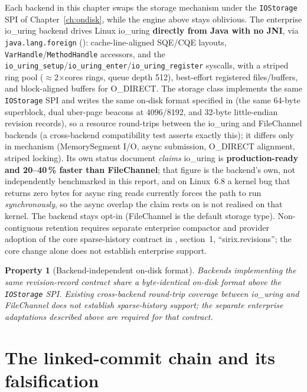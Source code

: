 \documentclass[11pt,a4paper,oneside]{report}
\theoremstyle{sirixthm}
\newtheorem{property}{Property}[chapter]
\newcommand{\code}[1]{\texttt{#1}}
\begin{document}
Each backend in this chapter swaps the storage mechanism under the \code{IOStorage} SPI of
Chapter~\ref{ch:ondisk}, while the engine above stays oblivious. The enterprise io\_uring
backend drives Linux io\_uring \textbf{directly from Java with no
JNI}, via \code{java.lang.foreign} (): cache-line-aligned SQE/CQE layouts,
\code{VarHandle}/\allowbreak\code{MethodHandle} accessors, and the
\code{io\_uring\_setup}/\allowbreak\code{io\_uring\_enter}/\allowbreak\code{io\_uring\_register} syscalls, with a
striped ring pool ($\approx$2$\times$cores rings, queue depth 512), best-effort registered
files/buffers, and block-aligned buffers for O\_DIRECT. The storage class implements the same
\code{IOStorage} SPI and writes the same on-disk format specified in 
(the same 64-byte superblock, dual uber-page beacons at 4096/8192, and 32-byte little-endian revision
records), so a resource round-trips between the io\_uring and FileChannel backends (a cross-backend
compatibility test asserts exactly this); it differs only in mechanism (MemorySegment I/O, async
submission, O\_DIRECT alignment, striped locking). Its own status document \emph{claims} io\_uring is
\textbf{production-ready and 20--40\,\% faster than FileChannel}; that figure is the backend's own, not
independently benchmarked in this report, and on Linux~6.8 a kernel bug that returns zero bytes for async
ring reads currently forces the path to run \emph{synchronously}, so the async overlap the claim rests on
is not realised on that kernel. The backend stays opt-in (FileChannel is the default storage type).
Non-contiguous retention requires separate enterprise compactor and provider adoption of the core
sparse-history contract in , section~1, ``sirix.revisions''; the core
change alone does not establish enterprise support.

\begin{property}[Backend-independent on-disk format]\label{prop:backendid}
Backends implementing the same revision-record contract share a byte-identical on-disk format
above the \code{IOStorage} SPI. Existing cross-backend
round-trip coverage between io\_uring and FileChannel does not establish sparse-history support;
the separate enterprise adaptations described above are required for that contract.
\end{property}

\section{The linked-commit chain and its falsification}
\end{document}
